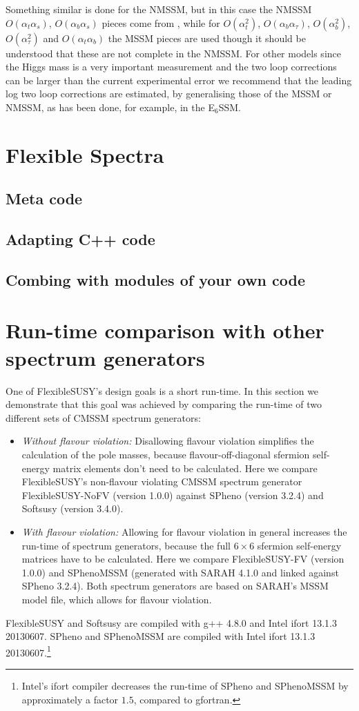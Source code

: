 \documentclass[final,3p,11pt,pdflatex]{elsarticle}
\newcommand{\fs}{FlexibleSUSY\xspace}
\def\at{\alpha_t}
\def\ab{\alpha_b}
\def\as{\alpha_s}
\def\atau{\alpha_{\tau}}
\def\oatab{O(\at\ab)}
\def\oatas{O(\at\as)}
\def\oabas{O(\ab\as)}
\def\oatq{O(\at^2)}
\def\oabq{O(\ab^2)}
\def\oatauq{O(\atau^2)}
\def\oabatau{O(\ab \atau)}
\begin{document}
Something similar is done for the NMSSM, but in this case the NMSSM
$\oatas$, $\oabas$ pieces come from \cite{Degrassi:2009yq}, while for
$\oatq$, $\oabatau$, $\oabq$, $\oatauq$ and $\oatab$ the MSSM pieces
are used though it should be understood that these are not complete in
the NMSSM. For other models since the Higgs mass is a very important
measurement and the two loop corrections can be larger than the
current experimental error \cite{Degrassi:2009yq} we recommend that
the leading log two loop corrections are estimated, by generalising
those of the MSSM or NMSSM, as has been done, for example, in the
E$_6$SSM\cite{King:2005jy}.

\section{Flexible Spectra}
\label{Sec:Flexible}
\subsection{Meta code}
\subsection{Adapting C++ code}
\subsection{Combing with  modules of your own code}

\section{Run-time comparison with other spectrum generators}
\label{Sec:comparison}

One of \fs's design goals is a short run-time.  In this section we
demonstrate that this goal was achieved by comparing the run-time of
two different sets of CMSSM spectrum generators:
%
\begin{itemize}
\item \emph{Without flavour violation:} Disallowing flavour violation
  simplifies the calculation of the pole masses, because
  flavour-off-diagonal sfermion self-energy matrix elements don't need
  to be calculated.  Here we compare \fs's non-flavour violating CMSSM
  spectrum generator FlexibleSUSY-NoFV (version 1.0.0) against SPheno
  (version 3.2.4) and Softsusy (version 3.4.0).
%
\item \emph{With flavour violation:} Allowing for flavour violation in
  general increases the run-time of spectrum generators, because the
  full $6\times 6$ sfermion self-energy matrices have to be
  calculated.  Here we compare FlexibleSUSY-FV (version 1.0.0) and
  SPhenoMSSM (generated with SARAH 4.1.0 and linked against SPheno
  3.2.4).  Both spectrum generators are based on SARAH's MSSM model
  file, which allows for flavour violation.
\end{itemize}
%
FlexibleSUSY and Softsusy are compiled with g++ 4.8.0 and Intel ifort
13.1.3 20130607.  SPheno and SPhenoMSSM are compiled with Intel ifort
13.1.3 20130607.\footnote{Intel's ifort compiler decreases the
  run-time of SPheno and SPhenoMSSM by approximately a factor $1.5$,
  compared to gfortran.}
\end{document}
